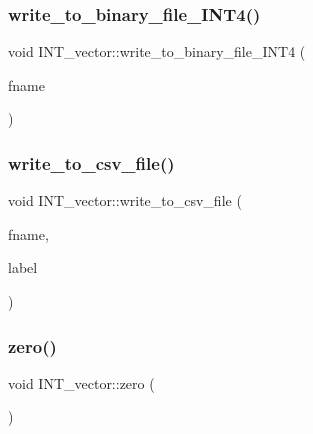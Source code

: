 \mbox{\label{class_i_n_t__vector_ad831ab13ad11e98bd0e59a45b0930a99}} 
\subsubsection{\texorpdfstring{write\+\_\+to\+\_\+binary\+\_\+file\+\_\+\+I\+N\+T4()}{write\_to\_binary\_file\_INT4()}}
{\footnotesize\ttfamily void I\+N\+T\+\_\+vector\+::write\+\_\+to\+\_\+binary\+\_\+file\+\_\+\+I\+N\+T4 (\begin{DoxyParamCaption}\item[{const \mbox{\hyperlink{galois_8h_ab6cc7b4aeb6ea31aba2b3fbfc83ff5e6}{B\+Y\+TE}} $\ast$}]{fname }\end{DoxyParamCaption})}

\mbox{\label{class_i_n_t__vector_a76087dbd91e6305c5020871623a57f5c}} 
\subsubsection{\texorpdfstring{write\+\_\+to\+\_\+csv\+\_\+file()}{write\_to\_csv\_file()}}
{\footnotesize\ttfamily void I\+N\+T\+\_\+vector\+::write\+\_\+to\+\_\+csv\+\_\+file (\begin{DoxyParamCaption}\item[{const \mbox{\hyperlink{galois_8h_ab6cc7b4aeb6ea31aba2b3fbfc83ff5e6}{B\+Y\+TE}} $\ast$}]{fname,  }\item[{const \mbox{\hyperlink{galois_8h_ab6cc7b4aeb6ea31aba2b3fbfc83ff5e6}{B\+Y\+TE}} $\ast$}]{label }\end{DoxyParamCaption})}

\mbox{\label{class_i_n_t__vector_a76a486fd25deb837d629bc3d46bcba78}} 
\subsubsection{\texorpdfstring{zero()}{zero()}}
{\footnotesize\ttfamily void I\+N\+T\+\_\+vector\+::zero (\begin{DoxyParamCaption}{ }\end{DoxyParamCaption})}



